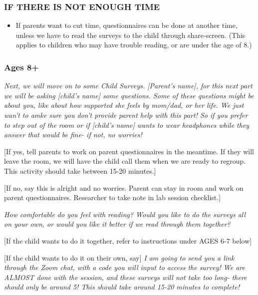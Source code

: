 \documentclass[
]{book}
\providecommand{\tightlist}{%
  \setlength{\itemsep}{0pt}\setlength{\parskip}{0pt}}
\begin{document}
\hypertarget{if-there-is-not-enough-time}{%
\subsubsection{IF THERE IS NOT ENOUGH TIME}\label{if-there-is-not-enough-time}}

\begin{itemize}
\tightlist
\item
  If parents want to cut time, questionnaires can be done at another time, unless we have to read the surveys to the child through share-screen. (This applies to children who may have trouble reading, or are under the age of 8.)
\end{itemize}

\hypertarget{ages-8}{%
\subsubsection{Ages 8+}\label{ages-8}}

\emph{Next, we will move on to some Child Surveys. {[}Parent's name{]}, for this next part we will be asking {[}child's name{]} some questions. Some of these questions might be about you, like about how supported she feels by mom/dad, or her life. We just wan't to amke sure you don't provide parent help with this part! So if you prefer to step out of the room or if {[}child's name{]} wants to wear headphones while they answer that would be fine- if not, no worries!}

{[}If yes, tell parents to work on parent questionnaires in the meantime. If they will leave the room, we will have the child call them when we are ready to regroup. This activity should take between 15-20 minutes.{]}

{[}If no, say this is alright and no worries. Parent can stay in room and work on parent questionnaires. Researcher to take note in lab session checklist.{]}

\emph{How comfortable do you feel with reading? Would you like to do the surveys all on your own, or would you like it better if we read through them together?}

{[}If the child wants to do it together, refer to instructions under AGES 6-7 below{]}

{[}If the child wants to do it on their own, say{]} \emph{I am going to send you a link through the Zoom chat, with a code you will input to access the survey! We are ALMOST done with the session, and these surveys will not take too long- there should only be around 5! This should take around 15-20 minutes to complete!}
\end{document}
